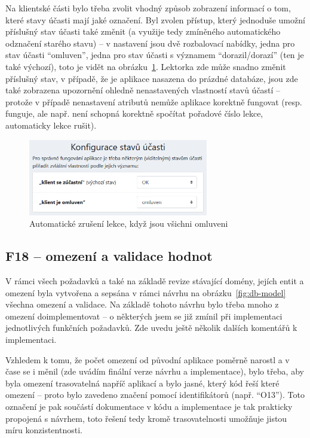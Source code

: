 Na klientské části bylo třeba zvolit vhodný způsob zobrazení informací o tom, které stavy účasti mají jaké označení. Byl zvolen přístup, který jednoduše umožní příslušný stav účasti také změnit (a využije tedy zmíněného automatického odznačení starého stavu) -- v nastavení jsou dvě rozbalovací nabídky, jedna pro stav účasti \enquote{omluven}, jedna pro stav účasti s významem \enquote{dorazil/dorazí} (ten je také výchozí), toto je vidět na obrázku~\ref{fig:ui-screen-vlastnostistavu}. Lektorka zde může snadno změnit příslušný stav, v případě, že je aplikace nasazena do prázdné databáze, jsou zde také zobrazena upozornění ohledně nenastavených vlastností stavů účastí -- protože v případě nenastavení atributů nemůže aplikace korektně fungovat (resp. funguje, ale např. není schopná korektně spočítat pořadové číslo lekce, automaticky lekce rušit).

\begin{figure}[h]\centering
    \includegraphics[width=0.7\textwidth]{img/ui-screen-vlastnostistavu.png}
    \caption{Automatické zrušení lekce, když jsou všichni omluveni}\label{fig:ui-screen-vlastnostistavu}
\end{figure}

\subsection{F18 -- omezení a validace hodnot}\label{subsec:F18implementace}

V rámci všech požadavků a také na základě revize stávající domény, jejích entit a omezení byla vytvořena a sepsána v rámci návrhu na obrázku~\ref{fig:db-model} všechna omezení a validace. Na základě tohoto návrhu bylo třeba mnoho z omezení doimplementovat -- o některých jsem se již zmínil při implementaci jednotlivých funkčních požadavků. Zde uvedu ještě několik dalších komentářů k implementaci.

Vzhledem k tomu, že počet omezení od původní aplikace poměrně narostl a v čase se i měnil (zde uvádím finální verze návrhu a implementace), bylo třeba, aby byla omezení trasovatelná napříč aplikací a bylo jasné, který kód řeší které omezení -- proto bylo zavedeno značení pomocí identifikátorů (např. \enquote{O13}). Toto označení je pak součástí dokumentace v kódu a implementace je tak prakticky propojená s návrhem, toto řešení tedy kromě trasovatelnosti umožňuje jistou míru konzistentnosti.

